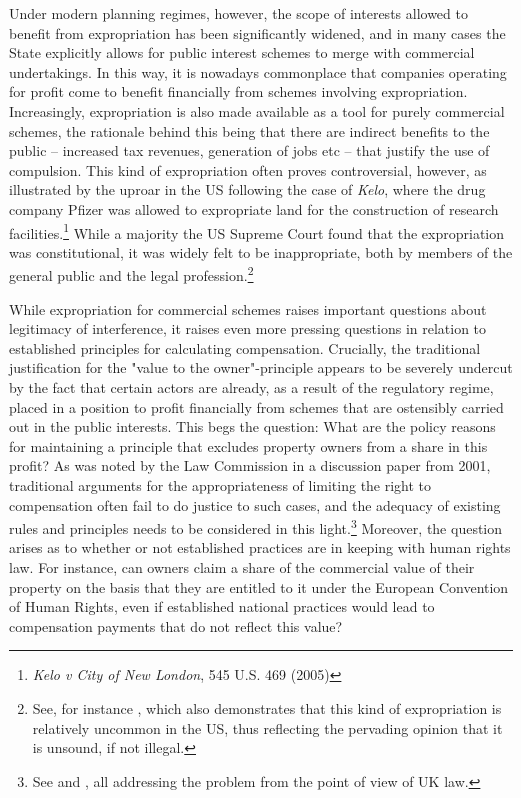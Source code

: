 Under modern planning regimes, however, the scope of interests allowed to benefit from expropriation has been significantly widened, and in many cases the State explicitly allows for public interest schemes to merge with commercial undertakings. In this way, it is nowadays commonplace that companies operating for profit come to benefit financially from schemes involving expropriation. Increasingly, expropriation is also made available as a tool for purely commercial schemes, the rationale behind this being that there are indirect benefits to the public -- increased tax revenues, generation of jobs etc -- that justify the use of compulsion. This kind of expropriation often proves controversial, however, as illustrated by the uproar in the US following the case of \emph{Kelo}, where the drug company Pfizer was allowed to expropriate land for the construction of research facilities.\footnote{\emph{Kelo v City of New London}, 545 U.S. 469 (2005)} While a majority the US Supreme Court found that the expropriation was constitutional, it was widely felt to be inappropriate, both by members of the general public and the legal profession.\footnote{See, for instance \cite{notimminent}, which also demonstrates that this kind of expropriation is relatively uncommon in the US, thus reflecting the pervading opinion that it is unsound, if not illegal.}

While expropriation for commercial schemes raises important questions about legitimacy of interference, it raises even more pressing questions in relation to established principles for calculating compensation. Crucially, the traditional justification for the "value to the owner"-principle appears to be severely undercut by the fact that certain actors are already, as a result of the regulatory regime, placed in a position to profit financially from schemes that are ostensibly carried out in the public interests. This begs the question: What are the policy reasons for maintaining a principle that excludes property owners from a share in this profit? As was noted by the Law Commission in a discussion paper from 2001, traditional arguments for the appropriateness of limiting the right to compensation often fail to do justice to such cases, and the adequacy of existing rules and principles needs to be considered in this light.\footnote{See \cite{lcdisc} and \cite{newuk,kelouk}, all addressing the problem from the point of view of UK law.} Moreover, the question arises as to whether or not established practices are in keeping with human rights law. For instance, can owners claim a share of the commercial value of their property on the basis that they are entitled to it under the European Convention of Human Rights, even if established national practices would lead to compensation payments that do not reflect this value?

